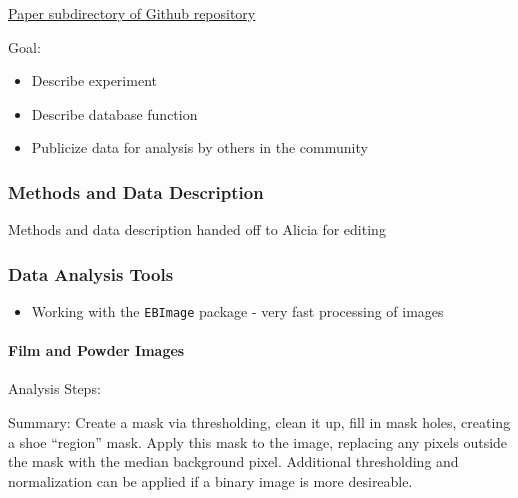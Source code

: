 \documentclass[]{book}
\providecommand{\tightlist}{%
  \setlength{\itemsep}{0pt}\setlength{\parskip}{0pt}}
\let\oldparagraph\paragraph
\renewcommand{\paragraph}[1]{\oldparagraph{#1}\mbox{}}
\begin{document}
\href{https://github.com/CSAFE-ISU/Longitudinal_Shoe_Study/tree/master/Paper}{Paper subdirectory of Github repository}

Goal:

\begin{itemize}
\tightlist
\item
  Describe experiment
\item
  Describe database function
\item
  Publicize data for analysis by others in the community
\end{itemize}

\hypertarget{lss-paper-methods}{%
\subsubsection*{Methods and Data Description}\label{lss-paper-methods}}

Methods and data description handed off to Alicia for editing

\hypertarget{lss-paper-analysis}{%
\subsubsection*{Data Analysis Tools}\label{lss-paper-analysis}}

\begin{itemize}
\tightlist
\item
  Working with the \texttt{EBImage} package - very fast processing of images
\end{itemize}

\hypertarget{lss-paper-analysis-film}{%
\paragraph{Film and Powder Images}\label{lss-paper-analysis-film}}

Analysis Steps:

Summary: Create a mask via thresholding, clean it up, fill in mask holes, creating a shoe ``region'' mask. Apply this mask to the image, replacing any pixels outside the mask with the median background pixel. Additional thresholding and normalization can be applied if a binary image is more desireable.
\end{document}
